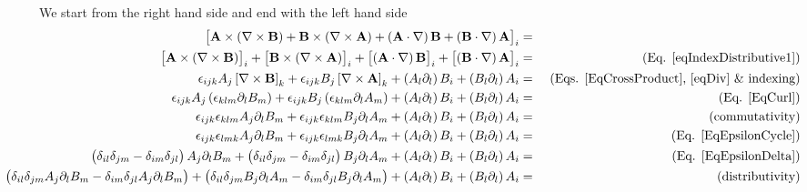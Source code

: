 We start from the right hand side and end with the left hand 
side{\footnotesize{}
\begin{eqnarray}
\left[\vector{A}\times\left(\nabla\times\vector{B}\right)+\vector{B}
\times\left(\nabla\times\vector{A}\right)+\left(\vector{A}
\cdot\nabla\right)\vector{B}+\left(\vector{B}\cdot\nabla\right)\vector{A}\right]
_{i} & =\nonumber \\
\left[\vector{A}\times\left(\nabla\times\vector{B}\right)\right]_{i}+\left[
\vector{B}\times\left(\nabla\times\vector{A}\right)\right]_{i}+\left[
\left(\vector{A}\cdot\nabla\right)\vector{B}\right]_{i}+\left[\left(\vector{B}
\cdot\nabla\right)\vector{A}\right]_{i} & = & \,\,\text{(Eq. 
\ref{eqIndexDistributive1})}\nonumber \\
\epsilon_{ijk}A_{j}\left[\nabla\times\vector{B}\right]_{k}+\epsilon_{ijk}B_{j}
\left[\nabla\times\vector{A}\right]_{k}+\left(A_{l}\partial_{l}\right)B_{i}
+\left(B_{l}\partial_{l}\right)A_{i} & = & \,\,\text{(Eqs. \ref{EqCrossProduct}, 
\ref{eqDiv} \& indexing)}\nonumber \\
\epsilon_{ijk}A_{j}\left(\epsilon_{klm}\partial_{l}B_{m}\right)+\epsilon_{ijk}B_
{j}\left(\epsilon_{klm}\partial_{l}A_{m}\right)+\left(A_{l}\partial_{l}\right)B_
{i}+\left(B_{l}\partial_{l}\right)A_{i} & = & \,\,\text{(Eq. 
\ref{EqCurl})}\nonumber \\
\epsilon_{ijk}\epsilon_{klm}A_{j}\partial_{l}B_{m}+\epsilon_{ijk}\epsilon_{klm}
B_{j}\partial_{l}A_{m}+\left(A_{l}\partial_{l}\right)B_{i}+\left(B_{l}\partial_{
l}\right)A_{i} & = & \,\,\text{(commutativity)}\nonumber \\
\epsilon_{ijk}\epsilon_{lmk}A_{j}\partial_{l}B_{m}+\epsilon_{ijk}\epsilon_{lmk}
B_{j}\partial_{l}A_{m}+\left(A_{l}\partial_{l}\right)B_{i}+\left(B_{l}\partial_{
l}\right)A_{i} & = & \,\,\text{(Eq. \ref{EqEpsilonCycle})}\nonumber \\
\left(\delta_{il}\delta_{jm}-\delta_{im}\delta_{jl}\right)A_{j}\partial_{l}B_{m}
+\left(\delta_{il}\delta_{jm}-\delta_{im}\delta_{jl}\right)B_{j}\partial_{l}A_{m
}+\left(A_{l}\partial_{l}\right)B_{i}+\left(B_{l}\partial_{l}\right)A_{i} & = & 
\,\,\text{(Eq. \ref{EqEpsilonDelta})}\\
\hspace*{-1.5cm}\left(\delta_{il}\delta_{jm}A_{j}\partial_{l}B_{m}-\delta_{im}
\delta_{jl}A_{j}\partial_{l}B_{m}\right)+\left(\delta_{il}\delta_{jm}B_{j}
\partial_{l}A_{m}-\delta_{im}\delta_{jl}B_{j}\partial_{l}A_{m}\right)+\left(A_{l
}\partial_{l}\right)B_{i}+\left(B_{l}\partial_{l}\right)A_{i} & = & 
\,\,\text{(distributivity)}\nonumber \\

\end{eqnarray}}
